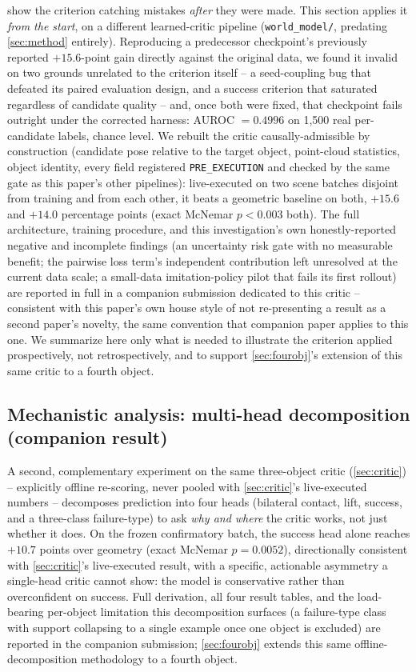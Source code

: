\documentclass[journal]{IEEEtran}
\begin{document}
 show the criterion catching
mistakes \emph{after} they were made. This section applies it \emph{from
the start}, on a different learned-critic pipeline (\texttt{world\_model/},
predating \cref{sec:method} entirely). Reproducing a predecessor
checkpoint's previously reported $+15.6$-point gain directly against the
original data, we found it invalid on two grounds unrelated to the
criterion itself -- a seed-coupling bug that defeated its paired
evaluation design, and a success criterion that saturated regardless of
candidate quality -- and, once both were fixed, that checkpoint fails
outright under the corrected harness: AUROC $=0.4996$ on 1{,}500 real
per-candidate labels, chance level. We rebuilt the critic
causally-admissible by construction (candidate pose relative to the
target object, point-cloud statistics, object identity, every field
registered \texttt{PRE\_EXECUTION} and checked by the same gate as this
paper's other pipelines): live-executed on two scene batches disjoint
from training and from each other, it beats a geometric baseline on
both, $+15.6$ and $+14.0$ percentage points (exact McNemar $p<0.003$
both). The full architecture, training procedure, and this
investigation's own honestly-reported negative and incomplete findings
(an uncertainty risk gate with no measurable benefit; the pairwise loss
term's independent contribution left unresolved at the current data
scale; a small-data imitation-policy pilot that fails its first rollout)
are reported in full in a companion submission dedicated to this critic
-- consistent with this paper's own house style of not re-presenting a
result as a second paper's novelty, the same convention that companion
paper applies to this one. We summarize here only what is needed to
illustrate the criterion applied prospectively, not retrospectively, and
to support \cref{sec:fourobj}'s extension of this same critic to a
fourth object.

\subsection{Mechanistic analysis: multi-head decomposition (companion result)}
\label{sec:multihead}

A second, complementary experiment on the same three-object critic
(\cref{sec:critic}) -- explicitly offline re-scoring, never pooled with
\cref{sec:critic}'s live-executed numbers -- decomposes prediction into
four heads (bilateral contact, lift, success, and a three-class
failure-type) to ask \emph{why and where} the critic works, not just
whether it does. On the frozen confirmatory batch, the success head
alone reaches $+10.7$ points over geometry (exact McNemar $p=0.0052$),
directionally consistent with \cref{sec:critic}'s live-executed result,
with a specific, actionable asymmetry a single-head critic cannot show:
the model is conservative rather than overconfident on success. Full
derivation, all four result tables, and the load-bearing per-object
limitation this decomposition surfaces (a failure-type class with
support collapsing to a single example once one object is excluded) are
reported in the companion submission; \cref{sec:fourobj} extends this
same offline-decomposition methodology to a fourth object.
\end{document}
